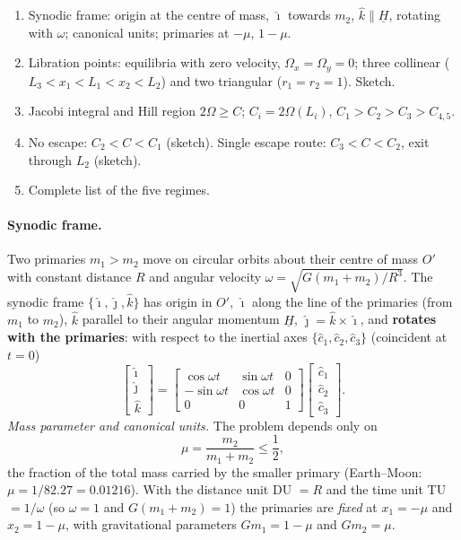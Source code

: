 \begin{outline}
\begin{enumerate}
\item Synodic frame: origin at the centre of mass, $\hat\imath$ towards $m_2$, $\hat k\parallel\underline H$, rotating with $\omega$; canonical units; primaries at $-\mu$, $1-\mu$.
\item Libration points: equilibria with zero velocity, $\Omega_x=\Omega_y=0$; three collinear ($L_3<x_1<L_1<x_2<L_2$) and two triangular ($r_1=r_2=1$). Sketch.
\item Jacobi integral and Hill region $2\Omega\ge C$; $C_i=2\Omega(L_i)$, $C_1>C_2>C_3>C_{4,5}$.
\item No escape: $C_2<C<C_1$ (sketch). Single escape route: $C_3<C<C_2$, exit through $L_2$ (sketch).
\item Complete list of the five regimes.
\end{enumerate}
\end{outline}

\answer
\paragraph{Synodic frame.} Two primaries $m_1>m_2$ move on circular orbits about their centre of mass $O'$ with constant
distance $R$ and angular velocity $\omega=\sqrt{G(m_1+m_2)/R^3}$. The synodic frame $\{\hat\imath,\hat\jmath,\hat k\}$ has origin in
$O'$, $\hat\imath$ along the line of the primaries (from $m_1$ to $m_2$), $\hat k$ parallel to their angular momentum
$\underline H$, $\hat\jmath=\hat k\times\hat\imath$, and \textbf{rotates with the primaries}: with respect to the inertial axes
$\{\hat c_1,\hat c_2,\hat c_3\}$ (coincident at $t=0$)
\begin{equation}
\begin{bmatrix}\hat\imath\\ \hat\jmath\\ \hat k\end{bmatrix}=
\begin{bmatrix}\cos\omega t&\sin\omega t&0\\-\sin\omega t&\cos\omega t&0\\0&0&1\end{bmatrix}
\begin{bmatrix}\hat c_1\\ \hat c_2\\ \hat c_3\end{bmatrix}.
\end{equation}
\emph{Mass parameter and canonical units.} The problem depends only on
\begin{equation}
\mu=\frac{m_2}{m_1+m_2}\le\frac12,
\end{equation}
the fraction of the total mass carried by the smaller primary (Earth--Moon: $\mu=1/82.27=0.01216$). With the distance unit
DU $=R$ and the time unit TU $=1/\omega$ (so $\omega=1$ and $G(m_1+m_2)=1$) the primaries are \emph{fixed} at $x_1=-\mu$ and
$x_2=1-\mu$, with gravitational parameters $Gm_1=1-\mu$ and $Gm_2=\mu$.

